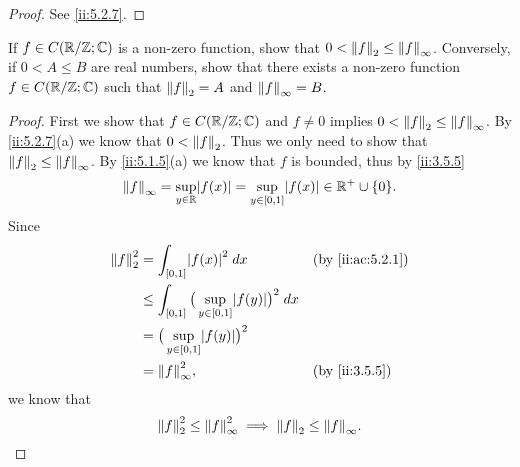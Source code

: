 \begin{proof}
  See \cref{ii:5.2.7}.
\end{proof}

\begin{ex}\label{ii:ex:5.2.3}
  If \(f \in C(\R / \Z ; \C)\) is a non-zero function, show that \(0 < \norm*{f}_2 \leq \norm*{f}_\infty\).
  Conversely, if \(0 < A \leq B\) are real numbers, show that there exists a non-zero function \(f \in C(\R / \Z ; \C)\) such that \(\norm*{f}_2 = A\) and \(\norm*{f}_\infty = B\).
\end{ex}

\begin{proof}
  First we show that \(f \in C(\R / \Z ; \C)\) and \(f \neq 0\) implies \(0 < \norm*{f}_2 \leq \norm*{f}_{\infty}\).
  By \cref{ii:5.2.7}(a) we know that \(0 < \norm*{f}_2\).
  Thus we only need to show that \(\norm*{f}_2 \leq \norm*{f}_\infty\).
  By \cref{ii:5.1.5}(a) we know that \(f\) is bounded, thus by \cref{ii:3.5.5}
  \[
    \norm*{f}_{\infty} = \sup_{y \in \R} \abs{f(x)} = \sup_{y \in [0, 1]} \abs{f(x)} \in \R^+ \cup \set{0}.
  \]
  Since
  \begin{align*}
    \norm*{f}_2^2 & = \int_{[0, 1]} \abs{f(x)}^2 \; dx                                  &  & \by{ii:ac:5.2.1} \\
                  & \leq \int_{[0, 1]} \big(\sup_{y \in [0, 1]} \abs{f(y)}\big)^2 \; dx                       \\
                  & = \big(\sup_{y \in [0, 1]} \abs{f(y)}\big)^2                                              \\
                  & = \norm*{f}_{\infty}^2,                                             &  & \by{ii:3.5.5}
  \end{align*}
  we know that
  \[
    \norm*{f}_2^2 \leq \norm*{f}_{\infty}^2 \implies \norm*{f}_2 \leq \norm*{f}_{\infty}.
  \]


\end{proof}
